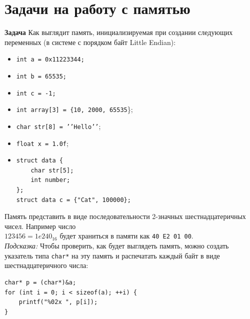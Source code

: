 \documentclass{article}
\begin{document}
\section*{Задачи на работу с памятью}
\textbf{Задача } Как выглядит память, инициализируемая при создании следующих переменных (в системе с порядком байт Little Endian):
\begin{multicols}{2}
\begin{itemize}
\item \texttt{int a = 0x11223344;}
\item \texttt{int b = 65535;}
\item \texttt{int c = -1;}
\item \texttt{int array[3] = \{10, 2000, 65535}\};
\item \texttt{char str[8] = '{}'Hello'{}'};
\item \texttt{float x = 1.0f};
\item
\begin{verbatim}
struct data {
    char str[5];
    int number;
};
struct data c = {"Cat", 100000};
\end{verbatim}
\end{itemize}
\end{multicols}
Память представить в виде последовательности 2-значных шестнадцатеричных чисел. Например число \\
$123456 = 1e240_{16}$ будет храниться в памяти как \texttt{40 E2 01 00}. \\
\textit{Подсказка:} Чтобы проверить, как будет выглядеть память, можно создать указатель типа \texttt{char*} на эту память и распечатать каждый байт в виде шестнадцатеричного числа:
\begin{lstlisting}
char* p = (char*)&a;
for (int i = 0; i < sizeof(a); ++i) {
    printf("%02x ", p[i]);
}
\end{lstlisting}



\newpage
\end{document}
